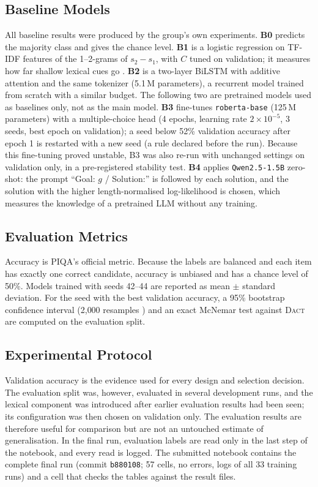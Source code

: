 \documentclass[11pt]{article}
\newcommand{\dact}{\textsc{Dact}}
\begin{document}
\subsection{Baseline Models}
All baseline results were produced by the group's own experiments. \textbf{B0} predicts the majority class and gives the chance level. \textbf{B1} is a logistic regression on TF-IDF features of the 1--2-grams of $s_2 - s_1$, with $C$ tuned on validation; it measures how far shallow lexical cues go \cite{gururangan2018annotation}. \textbf{B2} is a two-layer BiLSTM with additive attention and the same tokenizer (5.1\,M parameters), a recurrent model trained from scratch with a similar budget. The following two are pretrained models used as baselines only, not as the main model. \textbf{B3} fine-tunes \texttt{roberta-base} \cite{liu2019roberta} (125\,M parameters) with a multiple-choice head (4 epochs, learning rate $2{\times}10^{-5}$, 3 seeds, best epoch on validation); a seed below 52\% validation accuracy after epoch 1 is restarted with a new seed (a rule declared before the run). Because this fine-tuning proved unstable, B3 was also re-run with unchanged settings on validation only, in a pre-registered stability test. \textbf{B4} applies \texttt{Qwen2.5-1.5B} \cite{qwen2025qwen25} zero-shot: the prompt ``Goal: $g$ / Solution:'' is followed by each solution, and the solution with the higher length-normalised log-likelihood is chosen, which measures the knowledge of a pretrained LLM without any training.

\subsection{Evaluation Metrics}
Accuracy is PIQA's official metric. Because the labels are balanced and each item has exactly one correct candidate, accuracy is unbiased and has a chance level of 50\%. Models trained with seeds 42--44 are reported as mean $\pm$ standard deviation. For the seed with the best validation accuracy, a 95\% bootstrap confidence interval (2{,}000 resamples \cite{efron1993bootstrap}) and an exact McNemar test \cite{mcnemar1947note} against \dact{} are computed on the evaluation split.

\subsection{Experimental Protocol}\label{sec:protocol}
Validation accuracy is the evidence used for every design and selection decision. The evaluation split was, however, evaluated in several development runs, and the lexical component was introduced after earlier evaluation results had been seen; its configuration was then chosen on validation only. The evaluation results are therefore useful for comparison but are not an untouched estimate of generalisation. In the final run, evaluation labels are read only in the last step of the notebook, and every read is logged. The submitted notebook contains the complete final run (commit \texttt{b880108}; 57 cells, no errors, logs of all 33 training runs) and a cell that checks the tables against the result files.
\end{document}
